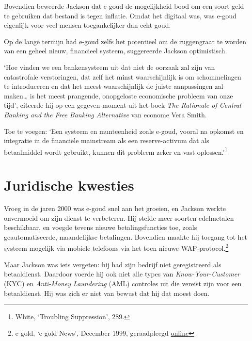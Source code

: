 \documentclass[smalldemyvopaper,11pt,twoside,onecolumn,openright,extrafontsizes,hidelinks]{memoir}
\begin{document}
Bovendien beweerde Jackson dat e-goud de mogelijkheid bood om een soort
geld te gebruiken dat bestand is tegen inflatie. Omdat het digitaal was,
was e-goud eigenlijk voor veel mensen toegankelijker dan echt goud.

Op de lange termijn had e-goud zelfs het potentieel om de ruggengraat te
worden van een geheel nieuw, financieel systeem, suggereerde Jackson
optimistisch.

`Hoe vinden we een bankensysteem uit dat niet de oorzaak zal zijn van
catastrofale verstoringen, dat zelf het minst waarschijnlijk is om
schommelingen te introduceren en dat het meest waarschijnlijk de juiste
aanpassingen zal maken\ldots{} is het meest prangende, onopgeloste
economische probleem van onze tijd', citeerde hij op een gegeven moment
uit het boek \emph{The Rationale of Central Banking and the Free Banking
Alternative} van econome Vera Smith.

Toe te voegen: `Een systeem en munteenheid zoals e-goud, vooral na
opkomst en integratie in de financiële mainstream als een
reserve-activum dat als betaalmiddel wordt gebruikt, kunnen dit probleem
zeker en vast oplossen.'\footnote{\hspace{0pt}White, `Troubling
  Suppression', 289.}

\section*{Juridische kwesties}\label{juridische-kwesties}


Vroeg in de jaren 2000 was e-goud snel aan het groeien, en Jackson
werkte onvermoeid om zijn dienst te verbeteren. Hij stelde meer soorten
edelmetalen beschikbaar, en voegde tevens nieuwe betalingsfuncties toe,
zoals geautomatiseerde, maandelijkse betalingen. Bovendien maakte hij
toegang tot het systeem mogelijk via mobiele telefoons via het toen
nieuwe WAP-protocol.\footnote{\hspace{0pt}e-gold, `e-gold News',
  December 1999, geraadpleegd
  \href{https://web.archive.org/web/20001209053900fw_/http://www.e-gold.com/news.html.}{online}}

Maar Jackson was iets vergeten: hij had zijn bedrijf niet geregistreerd
als betaaldienst. Daardoor voerde hij ook niet alle types van
\emph{Know-Your-Customer} (KYC) en \emph{Anti-Money Laundering} (AML)
controles uit die vereist zijn voor een betaaldienst. Hij was zich er
niet van bewust dat hij dat moest doen.
\end{document}
